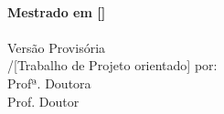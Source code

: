\begin{center}
\vspace{1.5cm}
\vfill
\Large{ \selectfont \Autor}\\
\vspace{1.8 cm}
\vfill
\large{\bf{\selectfont Mestrado em [\MDesignacao] }}\\
\large{\selectfont \MEspecializacao}\\
\vspace{0.8cm}
\vfill
\normalsize{\selectfont Versão Provisória}\\
\vspace{0.8cm}
\vfill
\large{/[Trabalho de Projeto orientado] por:}\\
\large{\selectfont Profª. Doutora \Orientador} \\
\large{\selectfont Prof. Doutor \PCoOrientador} \\
\vspace{1.5 cm}
\vfill

\vfill
\end{center}
\setcounter{page}{1}
\newpage
\mbox{}
\newpage



